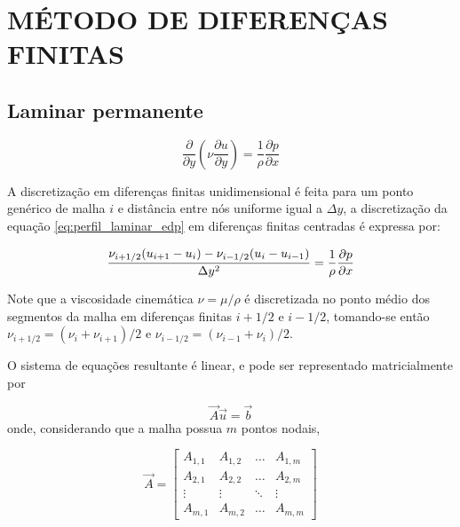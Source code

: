 \typeout{ ====================================================================}
\typeout{ ====================================================================}

\section{MÉTODO DE DIFERENÇAS FINITAS}

\subsection{Laminar permanente}

\begin{equation}
	\frac{\partial}{\partial y} \left(\nu \frac{\partial u}{\partial y}\right)
	=
	\frac{1}{\rho} \frac{\partial p}{\partial x}
	\label{eq:perfil_laminar_perm}
\end{equation}

A discretização em diferenças finitas unidimensional é feita para um
ponto genérico de malha $i$ e distância entre nós uniforme igual a
$\Delta y$, a discretização da equação \ref{eq:perfil_laminar_edp} em
diferenças finitas centradas é expressa por:

\begin{eqnarray}
	\frac{\nu_{i+1/2}(u_{i+1}-u_{i})
	-
	\nu_{i-1/2}(u_{i}-u_{i-1})}{\Delta y^2} 
	=
	\frac{1}{\rho}\frac{\partial p}{\partial x} 
\label{eq:perfil_laminar_discr}
\end{eqnarray}

Note que a viscosidade cinemática $\nu = \mu / \rho$ é discretizada no
ponto médio dos segmentos da malha em diferenças finitas $i+1/2$ e
$i-1/2$, tomando-se então $\nu_{i+1/2} = (\nu_{i}+\nu_{i+1})/2$ e
$\nu_{i-1/2} = (\nu_{i-1}+\nu_{i})/2$.

O sistema de equações resultante é linear, e pode ser representado matricialmente por

\begin{equation}
	\vec{A}\vec{u}=\vec{b}
	\label{eq:sistema_linear}
\end{equation}
onde, considerando que a malha possua $m$ pontos nodais,

\begin{equation}
	\vec{A} = \left[
	\begin{array}{cccc}
		A_{1,1} & A_{1,2} & \dots & A_{1,m}\\
		A_{2,1} & A_{2,2} & \dots & A_{2,m}\\
		\vdots  & \vdots  & \ddots  & \vdots\\
		A_{m,1} & A_{m,2} & \dots & A_{m,m}
	\end{array}
	\right]
\end{equation}

